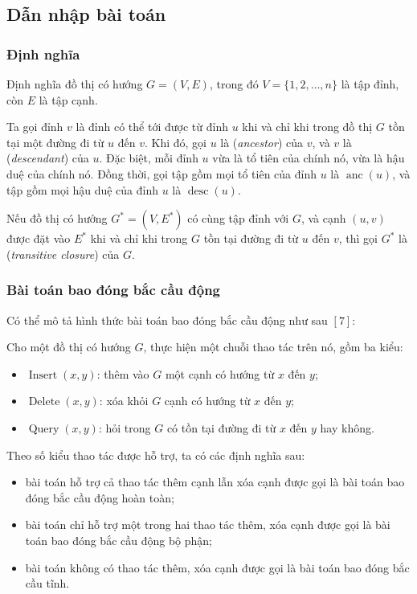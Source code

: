 \documentclass[11pt]{article}
\begin{document}
\subsection{Dẫn nhập bài toán}

\subsubsection{Định nghĩa}

Định nghĩa đồ thị có hướng \(G=(V,E)\), trong đó
\(V=\{1,2,\ldots,n\}\) là tập đỉnh, còn \(E\) là tập cạnh.

Ta gọi đỉnh \(v\) là đỉnh có thể tới được từ đỉnh \(u\) khi và chỉ khi trong
đồ thị \(G\) tồn tại một đường đi từ \(u\) đến \(v\). Khi đó, gọi \(u\) là
 (\emph{ancestor}) của \(v\), và \(v\) là 
(\emph{descendant}) của \(u\). Đặc biệt, mỗi đỉnh \(u\) vừa là tổ tiên của
chính nó, vừa là hậu duệ của chính nó. Đồng thời, gọi tập gồm mọi tổ tiên của
đỉnh \(u\) là \(\operatorname{anc}(u)\), và tập gồm mọi hậu duệ của đỉnh \(u\)
là \(\operatorname{desc}(u)\).

Nếu đồ thị có hướng \(G^*=(V,E^*)\) có cùng tập đỉnh với \(G\), và cạnh
\((u,v)\) được đặt vào \(E^*\) khi và chỉ khi trong \(G\) tồn tại đường đi từ
\(u\) đến \(v\), thì gọi \(G^*\) là 
(\emph{transitive closure}) của \(G\).

\subsubsection{Bài toán bao đóng bắc cầu động}

Có thể mô tả hình thức bài toán bao đóng bắc cầu động như sau \([7]\):

Cho một đồ thị có hướng \(G\), thực hiện một chuỗi thao tác trên nó, gồm ba
kiểu:
\begin{itemize}
  \item \(\operatorname{Insert}(x,y)\): thêm vào \(G\) một cạnh có hướng từ
  \(x\) đến \(y\);

  \item \(\operatorname{Delete}(x,y)\): xóa khỏi \(G\) cạnh có hướng từ \(x\)
  đến \(y\);

  \item \(\operatorname{Query}(x,y)\): hỏi trong \(G\) có tồn tại đường đi từ
  \(x\) đến \(y\) hay không.
\end{itemize}

Theo số kiểu thao tác được hỗ trợ, ta có các định nghĩa sau:
\begin{itemize}
  \item bài toán hỗ trợ cả thao tác thêm cạnh lẫn xóa cạnh được gọi là bài toán
  bao đóng bắc cầu động hoàn toàn;

  \item bài toán chỉ hỗ trợ một trong hai thao tác thêm, xóa cạnh được gọi là
  bài toán bao đóng bắc cầu động bộ phận;

  \item bài toán không có thao tác thêm, xóa cạnh được gọi là bài toán bao đóng
  bắc cầu tĩnh.
\end{itemize}
\end{document}
